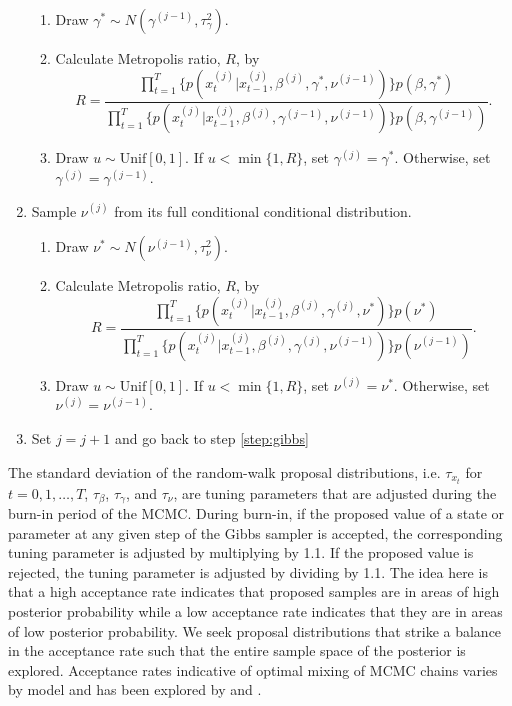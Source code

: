 \begin{enumerate}
    \begin{enumerate}
    \item Draw $\gamma^* \sim N(\gamma^{(j-1)},\tau^2_{\gamma})$.
    \item Calculate Metropolis ratio, $R$, by
    \[R = \frac{\prod_{t=1}^T \{p(x^{(j)}_t|x^{(j)}_{t-1},\beta^{(j)},\gamma^*,\nu^{(j-1)})\}p(\beta, \gamma^*)}{\prod_{t=1}^T \{p(x^{(j)}_t|x^{(j)}_{t-1},\beta^{(j)},\gamma^{(j-1)},\nu^{(j-1)})\}p(\beta, \gamma^{(j-1)})}.\]
    \item Draw $u \sim \mbox{Unif}[0,1]$. If $u < \min\{1, R\}$, set $\gamma^{(j)} = \gamma^*$. Otherwise, set $\gamma^{(j)} = \gamma^{(j-1)}$.
    \end{enumerate}
\item \label{step:nu} Sample $\nu^{(j)}$ from its full conditional conditional distribution.
    \begin{enumerate}
    \item Draw $\nu^* \sim N(\nu^{(j-1)},\tau^2_{\nu})$.
    \item Calculate Metropolis ratio, $R$, by
    \[R = \frac{\prod_{t=1}^T \{p(x^{(j)}_t|x^{(j)}_{t-1},\beta^{(j)},\gamma^{(j)},\nu^*)\}p(\nu^*)}{\prod_{t=1}^T \{p(x^{(j)}_t|x^{(j)}_{t-1},\beta^{(j)},\gamma^{(j)},\nu^{(j-1)})\}p(\nu^{(j-1)})}.\]
    \item Draw $u \sim \mbox{Unif}[0,1]$. If $u < \min\{1, R\}$, set $\nu^{(j)} = \nu^*$. Otherwise, set $\nu^{(j)} = \nu^{(j-1)}$.
    \end{enumerate}
\item Set $j = j + 1$ and go back to step \ref{step:gibbs}
\end{enumerate}
The standard deviation of the random-walk proposal distributions, i.e. $\tau_{x_t}$ for $t = 0,1,\ldots,T$, $\tau_{\beta}$, $\tau_{\gamma}$, and $\tau_{\nu}$, are tuning parameters that are adjusted during the burn-in period of the MCMC. During burn-in, if the proposed value of a state or parameter at any given step of the Gibbs sampler is accepted, the corresponding tuning parameter is adjusted by multiplying by 1.1. If the proposed value is rejected, the tuning parameter is adjusted by dividing by 1.1. The idea here is that a high acceptance rate indicates that proposed samples are in areas of high posterior probability while a low acceptance rate indicates that they are in areas of low posterior probability. We seek proposal distributions that strike a balance in the acceptance rate such that the entire sample space of the posterior is explored. Acceptance rates indicative of optimal mixing of MCMC chains varies by model and has been explored by \citet{Robe:Gel:gilks:1997:optmh} and \citet{bed:2008:optmh}.

